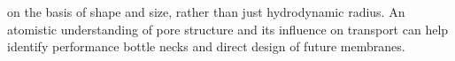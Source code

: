 on the basis of shape and size, rather than just hydrodynamic
radius. An atomistic understanding of pore structure and its influence on
transport can help identify performance bottle necks and direct design of
future membranes. 

